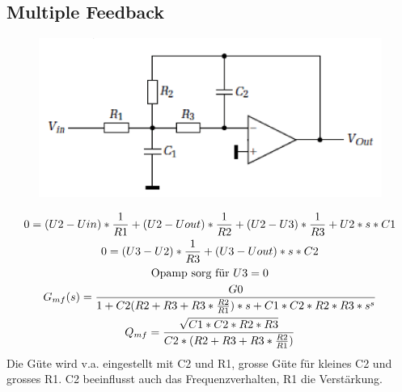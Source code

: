 \subsection{Multiple Feedback}
\begin{figure}[!h]
\centering
 \includegraphics[scale=0.5]{pictures/mulipleFeedback}
\end{figure}
\begin{gather}
0=(U2-Uin)*\frac{1}{R1}+(U2-Uout)*\frac{1}{R2}+(U2-U3)*\frac{1}{R3}+U2*s*C1\\
0=(U3-U2)*\frac{1}{R3}+(U3-Uout)*s*C2\\
\text{Opamp sorg für }U3=0\notag\\
G_{mf}(s)=\frac{G0}{1+C2(R2+R3+R3*\frac{R2}{R1})*s+C1*C2*R2*R3*s^s}\\
Q_{mf}=\frac{\sqrt{C1*C2*R2*R3}}{C2*(R2+R3+R3*\frac{R2}{R1})}
\end{gather}
Die Güte wird v.a. eingestellt mit C2 und R1, grosse Güte für kleines C2 und
grosses R1. C2 beeinflusst auch das Frequenzverhalten, R1 die Verstärkung.
\newpage
